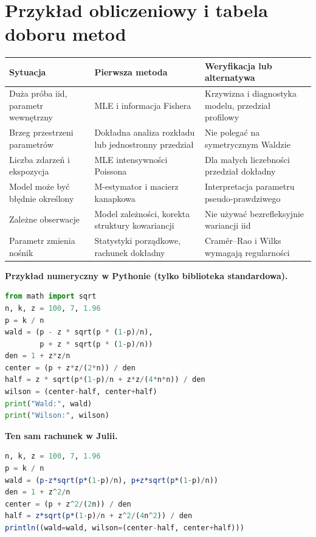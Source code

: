 \section{Przykład obliczeniowy i tabela doboru metod}
\begin{center}\small
\begin{tabular}{>{\raggedright\arraybackslash}p{}>{\raggedright\arraybackslash}p{}>{\raggedright\arraybackslash}p{}}
\toprule
\textbf{Sytuacja} & \textbf{Pierwsza metoda} & \textbf{Weryfikacja lub alternatywa}\\
\midrule
Duża próba iid, parametr wewnętrzny & MLE i informacja Fishera & Krzywizna i diagnostyka modelu, przedział profilowy\\
Brzeg przestrzeni parametrów & Dokładna analiza rozkładu lub jednostronny przedział & Nie polegać na symetrycznym Waldzie\\
Liczba zdarzeń i ekspozycja & MLE intensywności Poissona & Dla małych liczebności przedział dokładny\\
Model może być błędnie określony & M-estymator i macierz kanapkowa & Interpretacja parametru pseudo-prawdziwego\\
Zależne obserwacje & Model zależności, korekta struktury kowariancji & Nie używać bezrefleksyjnie wariancji iid\\
Parametr zmienia nośnik & Statystyki porządkowe, rachunek dokładny & Cramér--Rao i Wilks wymagają regularności\\
\bottomrule
\end{tabular}
\end{center}

\noindent\textbf{Przykład numeryczny w Pythonie (tylko biblioteka standardowa).}\par
\par
{}
\smallskip
\begin{lstlisting}[language=Python,caption={Porównanie przedziałów Walda i Wilsona dla odsetka wad.}]
from math import sqrt
n, k, z = 100, 7, 1.96
p = k / n
wald = (p - z * sqrt(p * (1-p)/n),
        p + z * sqrt(p * (1-p)/n))
den = 1 + z*z/n
center = (p + z*z/(2*n)) / den
half = z * sqrt(p*(1-p)/n + z*z/(4*n*n)) / den
wilson = (center-half, center+half)
print("Wald:", wald)
print("Wilson:", wilson)
\end{lstlisting}

\noindent\textbf{Ten sam rachunek w Julii.}\par
\par
{}
\smallskip
\begin{lstlisting}[language=Julia,caption={Obliczanie przedziałów Walda i Wilsona w Julii.}]
n, k, z = 100, 7, 1.96
p = k / n
wald = (p-z*sqrt(p*(1-p)/n), p+z*sqrt(p*(1-p)/n))
den = 1 + z^2/n
center = (p + z^2/(2n)) / den
half = z*sqrt(p*(1-p)/n + z^2/(4n^2)) / den
println((wald=wald, wilson=(center-half, center+half)))
\end{lstlisting}

